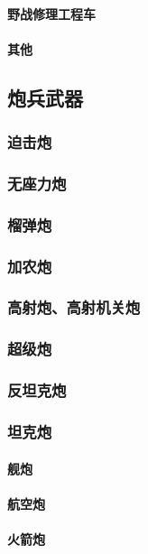 \documentclass[UTF8]{../ApplicationUniverse}
\begin{document}
            \paragraph{野战修理工程车}
            \paragraph{其他}

    \subsection{炮兵武器}
        \subsubsection{迫击炮}
        \subsubsection{无座力炮}
        \subsubsection{榴弹炮}
        \subsubsection{加农炮}
        \subsubsection{高射炮、高射机关炮}
        \subsubsection{超级炮}
        \subsubsection{反坦克炮}
        \subsubsection{坦克炮}
            \paragraph{舰炮}
            \paragraph{航空炮}
            \paragraph{火箭炮}
\end{document}
